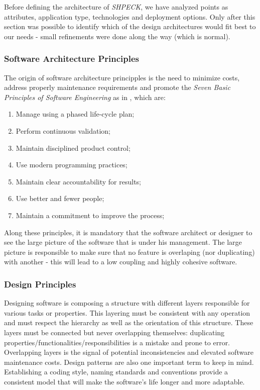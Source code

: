 \documentclass[ppgc,mestrado,english]{iiufrgs}
\begin{document}
Before defining the architecture of \emph{SHPECK}, we have analyzed points as attributes, application type, technologies and deployment options. Only after this section was possible to identify which of the design architectures would fit best to our needs - small refinements were done along the way (which is normal).

\subsubsection{Software Architecture Principles}
The origin of software architecture principples is the need to minimize costs, address properly maintenance requirements and promote the \emph{Seven Basic Principles of Software Engineering} as in \cite{Boehm:83}, which are:
\begin{enumerate}
\item Manage using a phased life-cycle plan;
\item Perform continuous validation;
\item Maintain disciplined product control;
\item Use modern programming practices;
\item Maintain clear accountability for results;
\item Use better and fewer people;
\item Maintain a commitment to improve the process;
\end{enumerate}
Along these principles, it is mandatory that the software architect or designer to see the large picture of the software that is under his management. The large picture is responsible to make sure that no feature is overlaping (nor duplicating) with another - this will lead to a low coupling and highly cohesive software. 

\subsubsection{Design Principles}
Designing software is composing a structure with different layers responsible for various tasks or properties. This layering must be consistent with any operation and must respect the hierarchy as well as the orientation of this structure.
These layers must be connected but never overlapping themselves: duplicating properties/functionalities/responsibilities is a mistake and prone to error. Overlapping layers is the signal of potential inconsistencies and elevated software maintenance costs. Design patterns are also one important term to keep in mind. Establishing a coding style, naming standards and conventions provide a consistent model that will make the software's life longer and more adaptable.
\end{document}
